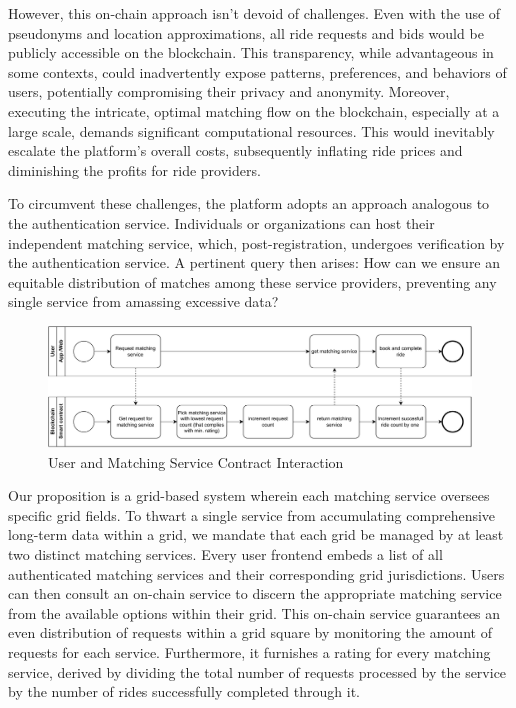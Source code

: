 However, this on-chain approach isn't devoid of challenges. Even with the use of pseudonyms and location approximations, all ride requests and bids would be publicly accessible on the blockchain. This transparency, while advantageous in some contexts, could inadvertently expose patterns, preferences, and behaviors of users, potentially compromising their privacy and anonymity. Moreover, executing the intricate, optimal matching flow on the blockchain, especially at a large scale, demands significant computational resources. This would inevitably escalate the platform's overall costs, subsequently inflating ride prices and diminishing the profits for ride providers.

To circumvent these challenges, the platform adopts an approach analogous to the authentication service. Individuals or organizations can host their independent matching service, which, post-registration, undergoes verification by the authentication service. A pertinent query then arises: How can we ensure an equitable distribution of matches among these service providers, preventing any single service from amassing excessive data?

\begin{figure}[h]
    \centering
    \includegraphics[width=\linewidth]{data/4.svg}
    \caption{User and Matching Service Contract Interaction}
    \label{fig:directSVG}
\end{figure}



Our proposition is a grid-based system wherein each matching service oversees specific grid fields. To thwart a single service from accumulating comprehensive long-term data within a grid, we mandate that each grid be managed by at least two distinct matching services. Every user frontend embeds a list of all authenticated matching services and their corresponding grid jurisdictions. Users can then consult an on-chain service to discern the appropriate matching service from the available options within their grid. This on-chain service guarantees an even distribution of requests within a grid square by monitoring the amount of requests for each service. Furthermore, it furnishes a rating for every matching service, derived by dividing the total number of requests processed by the service by the number of rides successfully completed through it.


